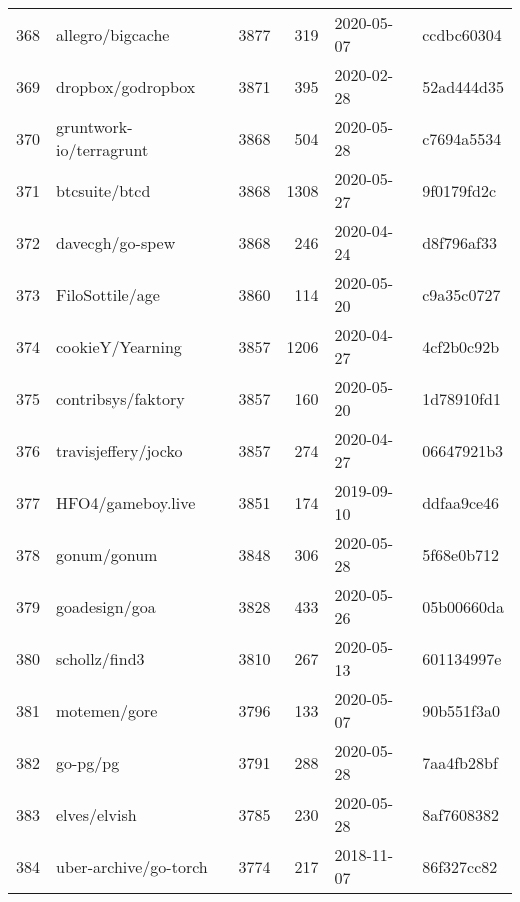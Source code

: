 \begin{footnotesize}
\begin{longtable}{llrrll}
        368 &                                   allegro/bigcache &   3877 &    319 & 2020-05-07 &  ccdbc60304 \\
        369 &                                  dropbox/godropbox &   3871 &    395 & 2020-02-28 &  52ad444d35 \\
        370 &                            gruntwork-io/terragrunt &   3868 &    504 & 2020-05-28 &  c7694a5534 \\
        371 &                                      btcsuite/btcd &   3868 &   1308 & 2020-05-27 &  9f0179fd2c \\
        372 &                                    davecgh/go-spew &   3868 &    246 & 2020-04-24 &  d8f796af33 \\
        373 &                                    FiloSottile/age &   3860 &    114 & 2020-05-20 &  c9a35c0727 \\
        374 &                                   cookieY/Yearning &   3857 &   1206 & 2020-04-27 &  4cf2b0c92b \\
        375 &                                 contribsys/faktory &   3857 &    160 & 2020-05-20 &  1d78910fd1 \\
        376 &                                travisjeffery/jocko &   3857 &    274 & 2020-04-27 &  06647921b3 \\
        377 &                                  HFO4/gameboy.live &   3851 &    174 & 2019-09-10 &  ddfaa9ce46 \\
        378 &                                        gonum/gonum &   3848 &    306 & 2020-05-28 &  5f68e0b712 \\
        379 &                                      goadesign/goa &   3828 &    433 & 2020-05-26 &  05b00660da \\
        380 &                                      schollz/find3 &   3810 &    267 & 2020-05-13 &  601134997e \\
        381 &                                       motemen/gore &   3796 &    133 & 2020-05-07 &  90b551f3a0 \\
        382 &                                           go-pg/pg &   3791 &    288 & 2020-05-28 &  7aa4fb28bf \\
        383 &                                       elves/elvish &   3785 &    230 & 2020-05-28 &  8af7608382 \\
        384 &                              uber-archive/go-torch &   3774 &    217 & 2018-11-07 &  86f327cc82 \\

\end{longtable}
\end{footnotesize}
